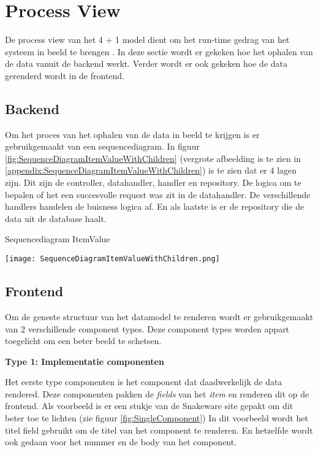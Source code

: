 \section{Process View}
De process view van het 4 + 1 model dient om het run-time gedrag van het systeem in beeld te brengen \parencite{4p1Model}.
In deze sectie wordt er gekeken hoe het ophalen van de data vanuit de backend werkt.
Verder wordt er ook gekeken hoe de data gerenderd wordt in de frontend.

\subsection{Backend}
Om het proces van het ophalen van de data in beeld te krijgen is er gebruikgemaakt van een sequencediagram.
In figuur \ref{fig:SequenceDiagramItemValueWithChildren} (vergrote afbeelding is te zien in \ref{appendix:SequenceDiagramItemValueWithChildren}) is te zien dat er 4 lagen zijn. 
Dit zijn de controller, datahandler, handler en repository.
De logica om te bepalen of het een succesvolle request was zit in de datahandler.
De verschillende handlers handelen de buisness logica af.
En als laatste is er de repository die de data uit de database haalt.

\whitespace
\begin{graphic}
    \captionsetup{type=figure}
    \caption{Sequencediagram ItemValue}
    \texttt{[image: SequenceDiagramItemValueWithChildren.png]}
    \label{fig:SequenceDiagramItemValueWithChildren}
\end{graphic}

\newpage
\subsection{Frontend}
\label{sec:FrontendProcessView}
Om de geneste structuur van het datamodel te renderen wordt er gebruikgemaakt van 2 verschillende component types.
Deze component types worden appart toegelicht om een beter beeld te schetsen.

\whitespace[2]
\textbf{Type 1: Implementatie componenten}

\whitespace
Het eerste type componenten is het component dat daadwerkelijk de data rendered.
Deze componenten pakken de \textit{fields} van het \textit{item} en renderen dit op de frontend.
Als voorbeeld is er een stukje van de Snakeware site gepakt om dit beter toe te lichten (zie figuur \ref{fig:SingleComponent})
In dit voorbeeld wordt het titel field  gebruikt om de titel van het component te renderen.
En hetzelfde wordt ook gedaan voor het nummer en de body van het component.

